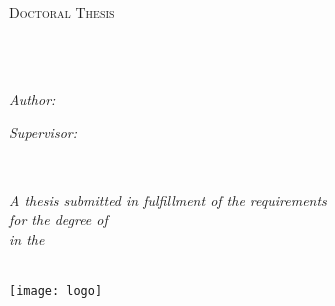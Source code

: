 \documentclass[
12pt, %
oneside, %
english, %
onehalfspacing, %
headsepline, %
]{MastersDoctoralThesis} %
\author{Bakytzhan \textsc{Urazbekov}} %
\begin{document}
\frontmatter %

\pagestyle{plain} %


\begin{titlepage}
\begin{center}

\vspace*{.06\textheight}
{\scshape\LARGE \univname\par}\vspace{1.5cm} %
\textsc{\Large Doctoral Thesis}\\[0.5cm] %

\HRule \\[0.4cm] %
{\huge \bfseries \ttitle\par}\vspace{0.4cm} %
\HRule \\[1.5cm] %
 
\begin{minipage}[t]{0.4\textwidth}
\begin{flushleft} \large
\emph{Author:}\\
\href{https://www.researchgate.net/profile/Bakytzhan_Urazbekov}{\authorname} %
\end{flushleft}
\end{minipage}
\begin{minipage}[t]{0.4\textwidth}
\begin{flushright} \large
\emph{Supervisor:} \\
\href{https://www.researchgate.net/profile/Nunzio_Itaco}{\supname} %
\end{flushright}
\end{minipage}\\[3cm]
 
\vfill

\large \textit{A thesis submitted in fulfillment of the requirements\\ for the degree of \degreename}\\[0.3cm] %
\textit{in the}\\[0.4cm]
\deptname\\[2cm] %
 
\vfill

\texttt{[image: logo]} %
 
\end{center}
\end{titlepage}
\end{document}

